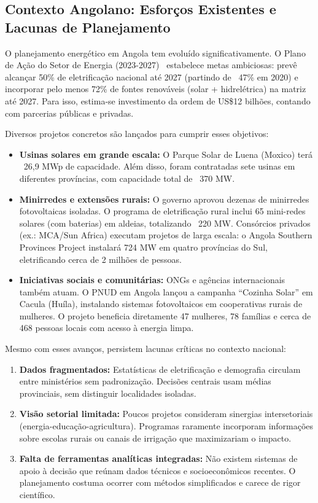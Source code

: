 \documentclass[12pt, a4paper]{article}
\begin{document}
\subsection{Contexto Angolano: Esforços Existentes e Lacunas de Planejamento}

O planejamento energético em Angola tem evoluído significativamente. O Plano de Ação do Setor de Energia (2023-2027)~\citep{governo_angola_2022} estabelece metas ambiciosas: prevê alcançar 50\% de eletrificação nacional até 2027 (partindo de ~47\% em 2020) e incorporar pelo menos 72\% de fontes renováveis (solar + hidrelétrica) na matriz até 2027. Para isso, estima-se investimento da ordem de US\$12 bilhões, contando com parcerias públicas e privadas.

Diversos projetos concretos são lançados para cumprir esses objetivos:

\begin{itemize}
\item \textbf{Usinas solares em grande escala:} O Parque Solar de Luena (Moxico) terá ~26,9 MWp de capacidade. Além disso, foram contratadas sete usinas em diferentes províncias, com capacidade total de ~370 MW.
\item \textbf{Minirredes e extensões rurais:} O governo aprovou dezenas de minirredes fotovoltaicas isoladas. O programa de eletrificação rural inclui 65 mini-redes solares (com baterias) em aldeias, totalizando ~220 MW. Consórcios privados (ex.: MCA/Sun Africa) executam projetos de larga escala: o Angola Southern Provinces Project instalará 724 MW em quatro províncias do Sul, eletrificando cerca de 2 milhões de pessoas.
\item \textbf{Iniciativas sociais e comunitárias:} ONGs e agências internacionais também atuam. O PNUD em Angola lançou a campanha ``Cozinha Solar'' em Cacula (Huíla), instalando sistemas fotovoltaicos em cooperativas rurais de mulheres. O projeto beneficia diretamente 47 mulheres, 78 famílias e cerca de 468 pessoas locais com acesso à energia limpa.
\end{itemize}

Mesmo com esses avanços, persistem lacunas críticas no contexto nacional:

\begin{enumerate}
\item \textbf{Dados fragmentados:} Estatísticas de eletrificação e demografia circulam entre ministérios sem padronização. Decisões centrais usam médias provinciais, sem distinguir localidades isoladas.
\item \textbf{Visão setorial limitada:} Poucos projetos consideram sinergias intersetoriais (energia-educação-agricultura). Programas raramente incorporam informações sobre escolas rurais ou canais de irrigação que maximizariam o impacto.
\item \textbf{Falta de ferramentas analíticas integradas:} Não existem sistemas de apoio à decisão que reúnam dados técnicos e socioeconômicos recentes. O planejamento costuma ocorrer com métodos simplificados e carece de rigor científico.
\end{enumerate}
\end{document}
